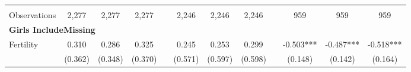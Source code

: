 \begin{landscape}
\begin{table}[htpb!]
\begin{center}
\begin{tabular}{lcccp{2mm}cccp{2mm}ccc}
\begin{footnotesize}\end{footnotesize}&\begin{footnotesize}\end{footnotesize}&\begin{footnotesize}\end{footnotesize}&\begin{footnotesize}\end{footnotesize}&\begin{footnotesize}\end{footnotesize}&\begin{footnotesize}\end{footnotesize}&\begin{footnotesize}\end{footnotesize}&\begin{footnotesize}\end{footnotesize}&\begin{footnotesize}\end{footnotesize}&\begin{footnotesize}\end{footnotesize}&\begin{footnotesize}\end{footnotesize}&\begin{footnotesize}\end{footnotesize}\\Observations&2,277&2,277&2,277&&2,246&2,246&2,246&&959&959&959\\
\multicolumn{12}{l}{\textbf{Girls IncludeMissing}}\\ 
Fertility&0.310&0.286&0.325&&0.245&0.253&0.299&&-0.503***&-0.487***&-0.518***\\
&(0.362)&(0.348)&(0.370)&&(0.571)&(0.597)&(0.598)&&(0.148)&(0.142)&(0.164)\\

\end{tabular}
\end{center}
\end{table}
\end{landscape}
